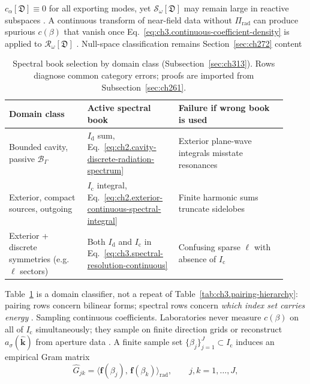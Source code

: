 \(c_\alpha[\mathfrak{D}]\equiv 0\) for all exporting modes, yet \(\mathcal{S}_\omega[\mathfrak{D}]\)
may remain large in reactive subspaces . A continuous transform of
near-field data without \(\Pi_{\mathrm{rad}}\) can produce spurious \(c(\beta)\) that vanish once
Eq.~\eqref{eq:ch3.continuous-coefficient-density} is applied to \(\mathcal{R}_\omega[\mathfrak{D}]\)
. Null-space classification remains Section~\ref{sec:ch272} content
\begin{table}[t]
\centering
\caption{Spectral book selection by domain class (Subsection~\ref{sec:ch313}). Rows diagnose common
category errors; proofs are imported from Subsection~\ref{sec:ch261}.}
\label{tab:ch3.spectral-domain-class}
\small
\begin{tabular}{@{}p{0.26\linewidth}p{0.30\linewidth}p{0.36\linewidth}@{}}
\toprule
Domain class & Active spectral book & Failure if wrong book is used \\
\midrule
Bounded cavity, passive \(\mathcal{B}_\Gamma\) &
\(I_{\mathrm{d}}\) sum, Eq.~\eqref{eq:ch2.cavity-discrete-radiation-spectrum} &
Exterior plane-wave integrals misstate resonances \\
\addlinespace
Exterior, compact sources, outgoing &
\(I_{\mathrm{c}}\) integral, Eq.~\eqref{eq:ch2.exterior-continuous-spectral-integral} &
Finite harmonic sums truncate sidelobes \\
\addlinespace
Exterior + discrete symmetries (e.g.\ \(\ell\) sectors) &
Both \(I_{\mathrm{d}}\) and \(I_{\mathrm{c}}\) in Eq.~\eqref{eq:ch3.spectral-resolution-continuous} &
Confusing sparse \(\ell\) with absence of \(I_{\mathrm{c}}\) \\
\bottomrule
\end{tabular}
\end{table}
Table~\ref{tab:ch3.spectral-domain-class} is a domain classifier, not a repeat of
Table~\ref{tab:ch3.pairing-hierarchy}: pairing rows concern bilinear forms; spectral rows concern
\emph{which index set carries energy} .
Sampling continuous coefficients. Laboratories never measure \(c(\beta)\) on all of \(I_{\mathrm{c}}\) simultaneously; they sample on
finite direction grids or reconstruct \(a_\sigma(\hat{\mathbf{k}})\) from aperture data
. A finite sample set \(\{\beta_j\}_{j=1}^{J}\subset I_{\mathrm{c}}\)
induces an empirical Gram matrix
\begin{equation}
\label{eq:ch3.continuous-sample-gram}
\widehat{G}_{jk}
=
\big\langle \mathbf{f}(\beta_j),\,\mathbf{f}(\beta_k)\big\rangle_{\mathrm{rad}},
\qquad
j,k=1,\ldots,J,
\end{equation}
